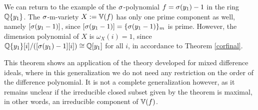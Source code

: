 \begin{theorem}
\begin{bew}
\end{bew}
\end{theorem}

\begin{ex}
We can return to the example of the $\sigma$-polynomial $f = \sigma(y_1) - 1$ in the ring $\mathbb{Q}\{y_1\}$. The $\sigma$-m-variety $X:= \mathbb{V}(f)$ has only one prime component as well, namely $[\sigma(y_1 -1)]$, since $[\sigma(y_1 -1 )] = \{ \sigma(y_1 -1) \}_m$ is prime.
However, the dimension polynomial of $X$ is $\omega_X(i) = 1$, since \\ $\mathbb{Q}\{y_1\}[i]/([\sigma(y_1) - 1][i]) \cong \mathbb{Q}[y_1]$ for all $i$, in accordance to Theorem \ref{corfinal}.
\end{ex}


This theorem shows an application of the theory developed for mixed difference ideals, where in this generalization we do not need any restriction on the order of the difference polynomial.
It is not a complete generalization however, as it remains unclear if the irreducible closed subset given by the theorem is maximal, in other words, an irreducible component of $\mathbb{V}(f)$.



